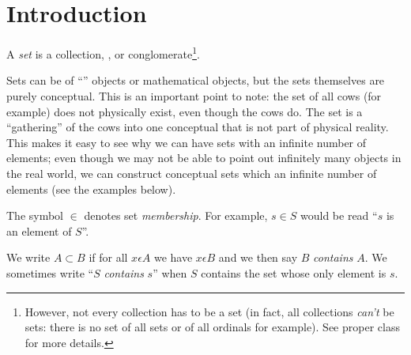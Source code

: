 \documentclass{article}
\begin{document}

\section{Introduction}

A \emph{set} is a collection, , or conglomerate\footnote{However, not every collection has to be a set (in fact, all collections \emph{can't} be sets: there is no set of all sets or of all ordinals for example). See proper class for more details.}.

Sets can be of ``'' objects or mathematical objects, but the sets themselves are purely conceptual. This is an important point to note: the set of all cows (for example) does not physically exist, even though the cows do. The set is a ``gathering'' of the cows into one conceptual  that is not part of physical reality. This makes it easy to see why we can have sets with an infinite number of elements; even though we may not be able to point out infinitely many objects in the real world, we can construct conceptual sets which an infinite number of elements (see the examples below).

The symbol $\in$ denotes set \emph{membership}. For example, \( s \in S \) would be read ``$s$ is an element of $S$''.


We write  $A \subset B$ if for all $x \epsilon A$ we have $x \epsilon B$
and we then say $B$ \emph{contains} $A$.
We sometimes write 
 ``$S$ \emph{contains} $s$'' when $S$ contains the 
set whose only element is $s$. %
\end{document}
